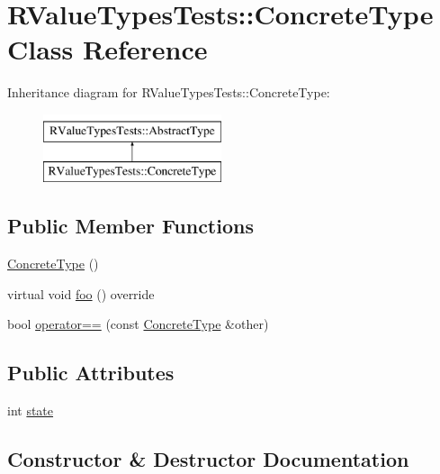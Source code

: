 \hypertarget{classRValueTypesTests_1_1ConcreteType}{}\section{R\+Value\+Types\+Tests\+::Concrete\+Type Class Reference}
\label{classRValueTypesTests_1_1ConcreteType}
Inheritance diagram for R\+Value\+Types\+Tests\+::Concrete\+Type\+:\begin{figure}[H]
\begin{center}
\leavevmode
\includegraphics[height=2.000000cm]{classRValueTypesTests_1_1ConcreteType}
\end{center}
\end{figure}
\subsection*{Public Member Functions}
\begin{DoxyCompactItemize}
\item 
\mbox{\hyperlink{classRValueTypesTests_1_1ConcreteType_addbc36112474ed7d4e4c31d3302d1d2a}{Concrete\+Type}} ()
\item 
virtual void \mbox{\hyperlink{classRValueTypesTests_1_1ConcreteType_a81934e34d992dbda4331cf4e1de0859b}{foo}} () override
\item 
bool \mbox{\hyperlink{classRValueTypesTests_1_1ConcreteType_a798601cc8c128dda8a648038bd29d1e8}{operator==}} (const \mbox{\hyperlink{classRValueTypesTests_1_1ConcreteType}{Concrete\+Type}} \&other)
\end{DoxyCompactItemize}
\subsection*{Public Attributes}
\begin{DoxyCompactItemize}
\item 
int \mbox{\hyperlink{classRValueTypesTests_1_1ConcreteType_afedad533fe3cd0067098511c14c2e46e}{state}}
\end{DoxyCompactItemize}


\subsection{Constructor \& Destructor Documentation}
\mbox{\label{classRValueTypesTests_1_1ConcreteType_addbc36112474ed7d4e4c31d3302d1d2a}} 
